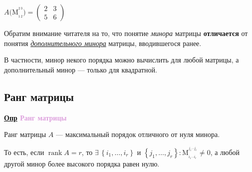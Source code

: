 \documentclass[12pt, a4paper]{report}
\newcommand{\df}[1][]{\begin{flushleft}\textbf{\underline{Опр} \textcolor{Plum}{#1}}\end{flushleft}}
\newcommand{\inlineperm}[3][i]{{#1}_{#2}\dotsb{#1}_{#3}}
\let\oldexists\exists
\renewcommand{\exists}{\oldexists\,}
\DeclareMathOperator{\rank}{rank}
\begin{document}
	\(A\Big(\mathrm{M}_{_{1\,2}}^{^{2\,3}}\Big)=\begin{pmatrix}2&3\\5&6\end{pmatrix}\)
	
	Обратим внимание читателя на то, что понятие \textit{минора} матрицы \textbf{отличается} от понятия \hyperref[2.5.1]{\textit{\color{MMagenta}дополнительного минора}} матрицы, вводившегося ранее. 
	
	В частности, минор некого порядка можно вычислить для любой матрицы, а дополнительный минор --- только для квадратной.
	\subsection{Ранг матрицы}
	\df[Ранг матрицы]
	
	Ранг матрицы \(A\) --- максимальный порядок отличного от нуля минора.
	
	То есть, если \(\rank A=r\), то \(\exists\left\{i_1,\dotsc,i_r\right\}\text{ и }\left\{j_1,\dotsc,j_r\right\}: \mathrm{M}_{_{\inlineperm{1}{r}}}^{^{\inlineperm[j]{1}{r}}}\neq 0\), а любой другой минор более высокого порядка равен нулю.
\end{document}
